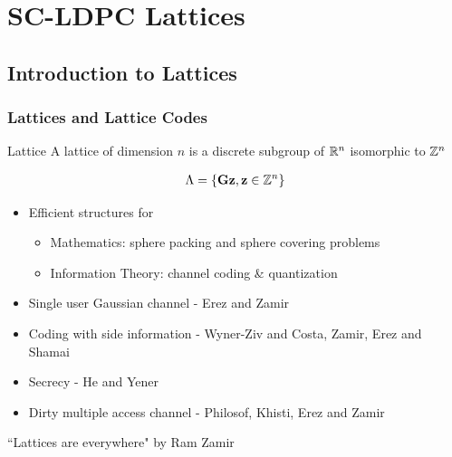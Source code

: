 \documentclass[10pt,presentation]{beamer}
\begin{document}
\section{SC-LDPC Lattices}
\subsection{Introduction to Lattices}
\begin{frame}\frametitle{Lattices and Lattice Codes}
\begin{block}{Lattice}
A lattice of dimension $n$ is a discrete subgroup of $\mathbb{R}^{n}$ isomorphic to $\mathbb{Z}^n$
\end{block}
\vspace{-10pt}
\begin{align*}
\Lambda=\{\mathbf{G}\mathbf{z}, \mathbf{z}\in\mathbb{Z}^{n}\}
\end{align*}
\vspace{-10pt}
\begin{itemize}
	\item Efficient structures for 
	\begin{itemize}
	 		 \item {\blue Mathematics}: sphere packing and sphere covering problems
	   		 \item{\blue Information Theory}: channel coding \& quantization
    \end{itemize}
    \item Single user Gaussian channel - Erez and Zamir
	\item Coding with side information - Wyner-Ziv and Costa, Zamir, Erez and Shamai
	\item Secrecy - He and Yener
	\item Dirty multiple access channel - Philosof, Khisti, Erez and Zamir
\end{itemize}
\vspace{5pt}
	
``Lattices are everywhere" by Ram Zamir
\end{frame}
\end{document}
